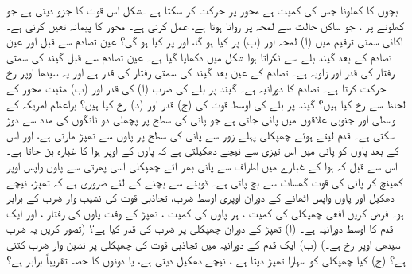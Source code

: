 بچوں کا  کھلونا  جس کی کمیت  ہے محور  پر حرکت کر سکتا ہے ۔شکل   اس قوت کا جزو  دیتی ہے جو  کھلونے پر  ، جو ساکن حالت سے لمحہ  پر  روانا ہوتا ہے، عمل کرتی ہے۔ محور  کا پیمانہ   تعین کرتی ہے۔ اکائی سمتی ترقیم میں (ا)  لمحہ  اور (ب)  پر  کیا ہو گا، اور  پر  کیا ہو گی؟
عین تصادم  سے قبل اور  عین تصادم کے بعد    گیند بلے سے ٹکراتا ہوا شکل  میں دکھایا گیا ہے۔  عین تصادم سے قبل گیند کی  سمتی رفتار   کی قدر  اور زاویہ  ہے۔ تصادم کے عین بعد گیند کی سمتی رفتار  کی قدر  ہے اور یہ سیدھا اوپر رخ حرکت کرتا ہے۔ تصادم کا دورانیہ  ہے۔ گیند پر بلے کی ضرب  (ا)  کی قدر اور (ب)   مثبت  محور کے لحاظ سے رخ کیا ہیں؟ گیند پر بلے کی اوسط قوت  کی (ج) قدر اور (د) رخ کیا ہیں؟
براعظم امریکہ کے  وسطی   اور جنوبی علاقوں میں  پائی جاتی ہے جو پانی کی سطح پر  پچھلی  دو  ٹانگوں  کی مدد سے دوڑ سکتی ہے۔  قدم لیتے ہوئے چھپکلی پہلے     زور سے    پانی کی سطح پر  پاوں سے تھپڑ مارتی ہے، اور اس کے بعد  پاوں  کو پانی میں   اس تیزی سے نیچے دھکیلتی ہے   کہ پاوں کے اوپر  ہوا کا غبارہ بن جاتا ہے۔اس سے قبل کہ ہوا کے غبارے میں  اطراف سے پانی بھر آئے  چھپکلی اسی پھرتی سے پاوں واپس اوپر کھینچ کر پانی کی  قوت  گھساٹ سے بچ پاتی ہے۔ ڈوبنے سے  بچنے کے لئے ضروری ہے کہ تھپڑ، نیچے دھکیل اور پاوں  واپس اٹھانے  کے دوران اوپری اوسط  ضرب،  تجاذبی  قوت کی  نشیب وار ضرب کے برابر ہو۔ فرض کریں افعی چھپکلی کی کمیت ، ہر  پاوں کی کمیت ،   تھپڑ کے وقت پاوں کی رفتار ، اور ایک قدم کا اوسط دورانیہ  ہے۔ (ا) تھپڑ کے دوران  چھپکلی پر ضرب کی قدر کیا ہے؟ (تصور کریں یہ ضرب سیدھی اوپر رخ ہے۔) (ب) ایک قدم کے    دورانیہ میں تجاذبی قوت کی چھپکلی پر نشین وار ضرب کتنی ہے؟ (ج)   کیا چھپکلی کو سہارا تھپڑ دیتا ہے ، نیچے دھکیل دیتی ہے،  یا دونوں کا حصہ تقریباً برابر ہے؟
 
